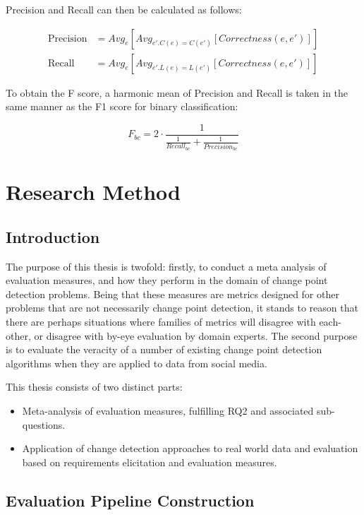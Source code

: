 \documentclass{uvamscse}	%
\begin{document}
	Precision and Recall can then be calculated as follows:
	
    \begin{align}
    \label{eqn:bcubed-precision}
        \text{Precision} &= Avg_e [Avg_{e' . C(e) = C(e')}[Correctness(e,e')]]\\
        \label{eqn:bcubed-recall}
        \text{Recall} &= Avg_e [Avg_{e' . L(e) = L(e')}[Correctness(e,e')]]
    \end{align}

To obtain the F score, a harmonic mean of Precision and Recall is taken in the same manner as the F1 score for binary classification:

\begin{equation}
    F_{bc} = 2 \cdot \frac{1}{\frac{1}{Recall_{bc}} + \frac{1}{Precision_{bc}}}
\end{equation}

\chapter{Research Method}
\label{Research Method}

\section{Introduction}

The purpose of this thesis is twofold: firstly, to conduct a meta analysis of evaluation measures, and how they perform in the domain of change point detection problems. Being that these measures are metrics designed for other problems that are not necessarily change point detection, it stands to reason that there are perhaps situations where families of metrics will disagree with each-other, or disagree with by-eye evaluation by domain experts. The second purpose is to evaluate the veracity of a number of existing change point detection algorithms when they are applied to data from social media.

This thesis consists of two distinct parts:

\begin{itemize}
  \item Meta-analysis of evaluation measures, fulfilling RQ2 and associated sub-questions.
  \item Application of change detection approaches to real world data and evaluation based on requirements elicitation and evaluation measures.
\end{itemize}

\section{Evaluation Pipeline Construction}
\end{document}
